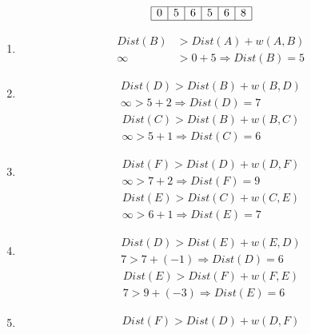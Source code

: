 \documentclass{article}
\begin{document}
\begin{multicols*}{2}
\begin{multicols*}{2}
\begin{align*}
\begin{array}{|c|c|c|c|c|c|}
                \hline
                0 & 5      & 6      & 5      & 6      & 8      \\
                \hline
            \end{array}
        \end{align*}
    \end{multicols*}
    \setlength{\leftmargini}{8em}
    \footnotesize
    \begin{enumerate}[label=Relaxation \arabic*:]
        \item \begin{align*} Dist(B) & > Dist(A) + w(A, B)             \\
               \infty  & > 0 + 5 \Rightarrow Dist(B) = 5
              \end{align*}
        \item \begin{align*} Dist(D) > Dist(B) + w(B, D) \\
                  \infty > 5 + 2 \Rightarrow Dist(D) = 7
              \end{align*}
              \begin{align*}
                  Dist(C) > Dist(B) + w(B, C) \\
                  \infty > 5 + 1 \Rightarrow Dist(C) = 6
              \end{align*}
        \item \begin{align*} Dist(F) > Dist(D) + w(D, F) \\
                  \infty > 7 + 2 \Rightarrow Dist(F) = 9
              \end{align*}
              \begin{align*}
                  Dist(E) > Dist(C) + w(C, E) \\
                  \infty > 6 + 1 \Rightarrow Dist(E) = 7
              \end{align*}
        \item \begin{align*} Dist(D) > Dist(E) + w(E, D) \\
                  7 > 7 + (-1) \Rightarrow Dist(D) = 6
              \end{align*}
              \begin{align*}
                  Dist(E) > Dist(F) + w(F, E) \\
                  7 > 9 + (-3) \Rightarrow Dist(E) = 6
              \end{align*}
        \item \begin{align*} Dist(F) > Dist(D) + w(D, F) \\

\end{align*}
\end{enumerate}
\end{multicols*}
\end{document}
